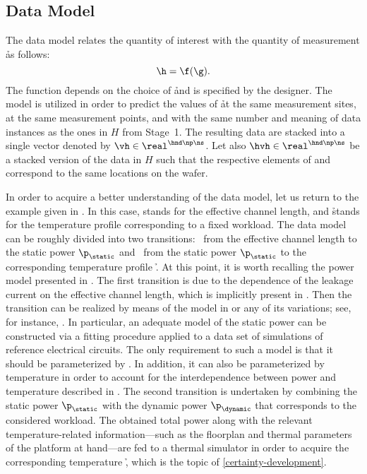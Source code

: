 \subsection{Data Model}

The data model relates the quantity of interest \g with the quantity of
measurement \h as follows:
\[
  \h = \f(\g).
\]
The function \f depends on the choice of \h and is specified by the designer.
The model is utilized in order to predict the values of \h at the same
measurement sites, at the same measurement points, and with the same number and
meaning of data instances as the ones in $H$ from Stage~1. The resulting data
are stacked into a single vector denoted by $\vh \in \real^{\hnd \np \ns}$. Let
also $\hvh \in \real^{\hnd \np \ns}$ be a stacked version of the data in $H$
such that the respective elements of \vh and \hvh correspond to the same
locations on the wafer.

In order to acquire a better understanding of the data model, let us return to
the example given in . In this case, \g stands for
the effective channel length, and \h stands for the temperature profile
corresponding to a fixed workload. The data model can be roughly divided into
two transitions: \one~from the effective channel length \g to the static power
$\p_\static$ and \two~from the static power $\p_\static$ to the corresponding
temperature profile \h. At this point, it is worth recalling the power model
presented in . The first transition is due to the dependence
of the leakage current on the effective channel length, which is implicitly
present in . Then the transition can be realized by means of
the model in  or any of its variations; see, for instance,
\cite{chandrakasan2000, srivastava2010, juan2012}. In particular, an adequate
model of the static power can be constructed via a fitting procedure applied to
a data set of  simulations of reference electrical circuits. The only
requirement to such a model is that it should be parameterized by \g. In
addition, it can also be parameterized by temperature in order to account for
the interdependence between power and temperature described in
. The second transition is undertaken by combining the static
power $\p_\static$ with the dynamic power $\p_\dynamic$ that corresponds to the
considered workload. The obtained total power along with the relevant
temperature-related information---such as the floorplan and thermal parameters
of the platform at hand---are fed to a thermal simulator in order to acquire the
corresponding temperature \h, which is the topic of
\cref{certainty-development}.

